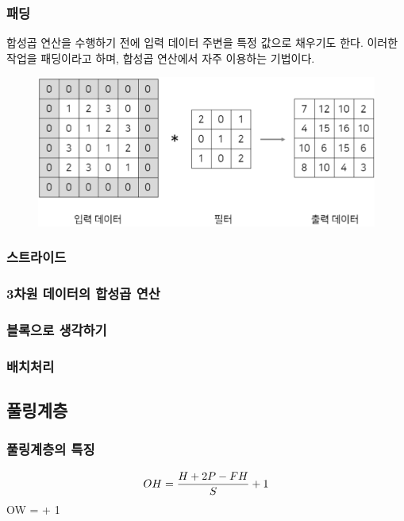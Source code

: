 \documentclass[11pt]{article}
\begin{document}
\subsubsection{패딩}
합성곱 연산을 수행하기 전에 입력 데이터 주변을 특정 값으로 채우기도 한다. 이러한 작업을 패딩이라고 하며, 합성곱 연산에서 자주 이용하는 기법이다.
\begin{figure}[h!]
    \includegraphics[width=1\columnwidth]{../Figure/Figure_5.pdf}
    \label{Fig.5}
\end{figure}  

\subsubsection{스트라이드}
\subsubsection{3차원 데이터의 합성곱 연산}
\subsubsection{블록으로 생각하기}
\subsubsection{배치처리}
\subsection{풀링계층}
\subsubsection{풀링계층의 특징}



$$ OH = \dfrac{H+2P-FH}{S} + 1 \\

$$ OW =  + 1 \\
\end{document}

